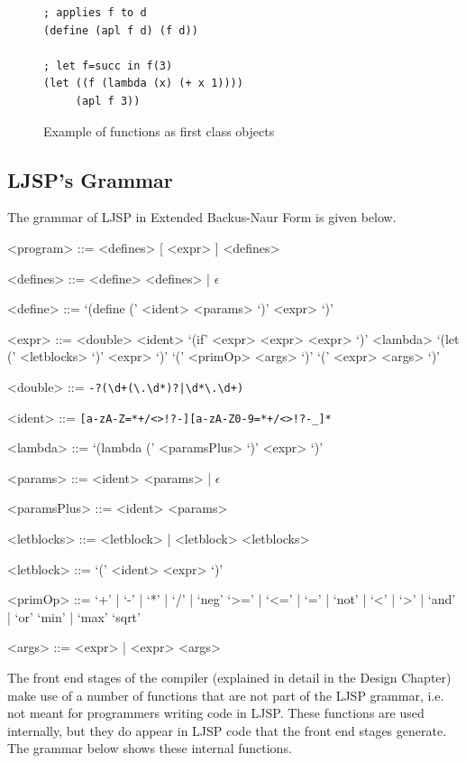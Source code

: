 \documentclass[11pt]{report}
\begin{document}
\begin{figure}[ht]
\begin{lstlisting}
; applies f to d
(define (apl f d) (f d))

; let f=succ in f(3)
(let ((f (lambda (x) (+ x 1)))) 
     (apl f 3))
\end{lstlisting}
\caption{Example of functions as first class objects}
\label{ljspexample2}
\end{figure}


\subsection{LJSP's Grammar}
The grammar of LJSP in Extended Backus-Naur Form is given below.

\begin{grammar}
<program> ::= <defines> [ <expr> ] <defines>

<defines> ::= <define> <defines> | $\epsilon$

<define> ::= `(define (' <ident> <params> `)' <expr> `)'

<expr> ::= <double>
\alt <ident>
\alt `(if' <expr> <expr> <expr> `)'
\alt <lambda>
\alt `(let (' <letblocks> `)' <expr> `)'
\alt `(' <primOp> <args> `)'
\alt `(' <expr> <args> `)'

<double> ::= \texttt{-?(\textbackslash d+(\textbackslash.\textbackslash d*)?|\textbackslash d*\textbackslash.\textbackslash d+)}

<ident> ::= \texttt{[a-zA-Z=*+/\textless\textgreater!?-][a-zA-Z0-9=*+/\textless\textgreater!?-_]*}

<lambda> ::= `(lambda (' <paramsPlus> `)' <expr> `)'

<params> ::= <ident> <params> | $\epsilon$

<paramsPlus> ::= <ident> <params>

<letblocks> ::= <letblock> | <letblock> <letblocks>

<letblock> ::= `(' <ident> <expr> `)'

<primOp> ::= `+' | `-' | `*' | `/' | `neg'
\alt `>=' | `<=' | `=' | `not' | `<' | `>' | `and' | `or'
\alt `min' | `max'
\alt `sqrt'

<args> ::= <expr> | <expr> <args>
\end{grammar}

The front end stages of the compiler (explained in detail in the Design Chapter) make use of a number of functions that are not part of the LJSP grammar, i.e. not meant for programmers writing code in LJSP. These functions are used internally, but they do appear in LJSP code that the front end stages generate. The grammar below shows these internal functions.
\end{document}
